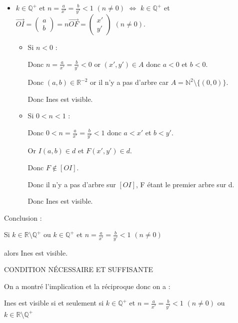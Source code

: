 \begin{tfjmenum}
\begin{itemize}
    Or $I(a,b)\in d$.

    Donc il n'existe pas d'arbre sur le segment $[OI]$.

    Donc Ines est visible.

    \item $k\in \mathbb{Q}^+$ et $n=\frac{a}{x'}=\frac{b}{y'}<1$ $(n\neq 0)$ $\Leftrightarrow$ $k\in \mathbb{Q}^+$ et $\vec{OI}=\begin{pmatrix} a \\ b \end{pmatrix} = n\vec{OF}=\begin{pmatrix} x' \\ y' \end{pmatrix}$ $(n\neq 0)$.

    \begin{itemize}
        \item Si $n<0$ :

        Donc $n=\frac{a}{x'}=\frac{b}{y'}<0$ or $(x',y')\in A$ donc $a<0$ et $b<0$.

        Donc $(a,b)\in \mathbb{R}^{-2}$ or il n'y a pas d'arbre car $A=\mathbb{N}^2 \setminus \{(0,0)\}$.

        Donc Ines est visible.

        \item Si $0<n<1$ :

        Donc $0<n=\frac{a}{x'}=\frac{b}{y'}<1$ donc $a<x'$ et $b<y'$.

        Or $I(a,b)\in d$ et $F(x',y')\in d$.

        Donc $F\notin[OI]$.

        Donc il n'y a pas d'arbre sur $[OI]$, F étant le premier arbre sur d.

        Donc Ines est visible.
    \end{itemize}
\end{itemize}

Conclusion :

Si $k\in \mathbb{R} \setminus \mathbb{Q}^+$ ou $k\in \mathbb{Q}^+$ et $n=\frac{a}{x'}=\frac{b}{y'}<1$ $(n\neq 0)$

alors Ines est visible.

\item

CONDITION NÉCESSAIRE ET SUFFISANTE

On a montré l'implication et la réciproque donc on a :

Ines est visible si et seulement si $k\in \mathbb{Q}^+$ et $n=\frac{a}{x'}=\frac{b}{y'}<1$ $(n\neq 0)$ ou $k\in \mathbb{R} \setminus \mathbb{Q}^+$

\end{tfjmenum}
